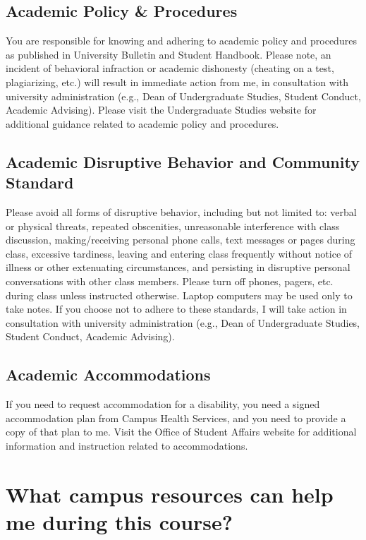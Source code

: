 \documentclass[11pt]{article}
\begin{document}
\subsection{Academic Policy \& Procedures}

You are responsible for knowing and adhering to academic policy and procedures as published in University Bulletin and Student Handbook. Please note, an incident of behavioral infraction or academic dishonesty (cheating on a test, plagiarizing, etc.) will result in immediate action from me, in consultation with university administration (e.g., Dean of Undergraduate Studies, Student Conduct, Academic Advising).  Please visit the Undergraduate Studies website for additional guidance related to academic policy and procedures.

\subsection{Academic Disruptive Behavior and Community Standard}

Please avoid all forms of disruptive behavior, including but not limited to: verbal or physical threats, repeated obscenities, unreasonable interference with class discussion, making/receiving personal phone calls, text messages or pages during class, excessive tardiness, leaving and entering class frequently without notice of illness or other extenuating circumstances, and persisting in disruptive personal conversations with other class members.  Please turn off phones, pagers, etc. during class unless instructed otherwise.  Laptop computers may be used only to take notes. If you choose not to adhere to these standards, I will take action in consultation with university administration (e.g., Dean of Undergraduate Studies, Student Conduct, Academic Advising).

\subsection{Academic Accommodations}

If you need to request accommodation for a disability, you need a signed accommodation plan from Campus Health Services, and you need to provide a copy of that plan to me. Visit the Office of Student Affairs website for additional information and instruction related to accommodations. 



\section{What campus resources can help me during this course?}
\end{document}
